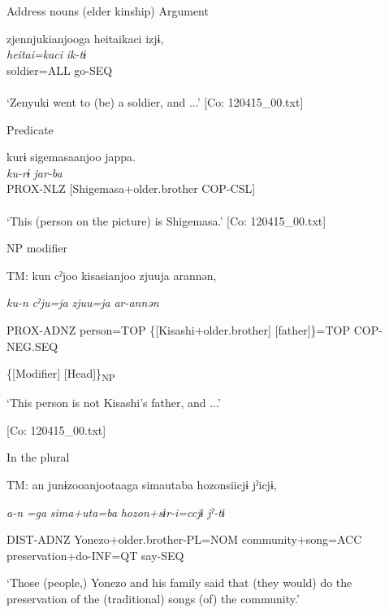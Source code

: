\ea \label{ex:7:6}  Address nouns (elder kinship)
\ea \label{ex:7:6a}Argument

\gllll  zjennjukianjooga  {\textbar}heitai{\textbar}kaci  izjɨ,\\
\textit{}  \textit{heitai=kaci}  \textit{ik-tɨ}\\
[Zenyuki+older.brother=NOM]  soldier=ALL  go-SEQ\\
[Subject]    \\
\glt ‘Zenyuki went to (be) a soldier, and ...’ [Co: 120415\_00.txt]

\ex \label{ex:7:6b}Predicate

\gllll  kurɨ  sigemasaanjoo  jappa.\\
\textit{ku-rɨ}  \textit{}  \textit{jar-ba}\\
PROX-NLZ  [Shigemasa+older.brother  COP-CSL]\\
[Nominal predicate]  \\
\glt ‘This (person on the picture) is Shigemasa.’ [Co: 120415\_00.txt]

\ex \label{ex:7:6c}NP modifier

    TM:  kun  cˀjoo  kisasianjoo  zjuuja  arannən,

      \textit{ku-n}  \textit{cˀju=ja}  \textit{}  \textit{zjuu=ja} \textit{ar-annən}
                                                                              
      PROX-ADNZ  person=TOP  \{[Kisashi+older.brother]  [father]\}=TOP         COP-NEG.SEQ

          \{[Modifier]  [Head]\}\textsubscript{NP}

      ‘This person is not Kisashi’s father, and ...’

      [Co: 120415\_00.txt]

\ex \label{ex:7:6d}In the plural

    TM:  an  junɨzooanjootaaga  simautaba hozonsiicjɨ  jˀicjɨ,

      \textit{a-n}  \textit{=ga}  \textit{sima+uta=ba}  \textit{hozon+sɨr-i=ccjɨ}  \textit{jˀ-tɨ}
                                                                        
      DIST-ADNZ  Yonezo+older.brother-PL=NOM  community+song=ACC         preservation+do-INF=QT  say-SEQ

      ‘Those (people,) Yonezo and his family said that (they would) do the preservation of the (traditional) songs (of) the community.’


